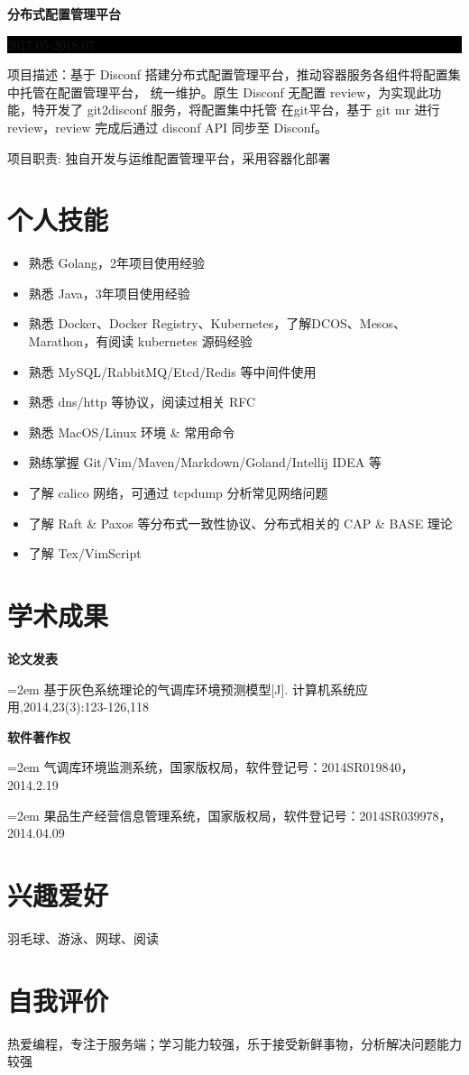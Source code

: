 \documentclass[paper=a4,fontsize=11pt]{scrartcl} %
\newcommand{\sepspace}{\vspace*{1em}}		%
\newcommand{\Section}[1]{\section*{ #1 }}          %
\newcommand{\SubSection}[2]{
	\sepspace \noindent \textbf{#1} \hfill      %
	\colorbox{Black}{\parbox{7em}{\hfill\color{White}#2}} \par  %
	\normalsize \par \sepspace}
\newcommand{\Academic}[2]{
		\noindent \textbf{#1} \par      %
		\hangindent=2em \small #2 %
		\normalsize \par}
\begin{document}
\begin{CJK}{UTF8}{gbsn}
\SubSection{分布式配置管理平台}{2017.05-2018.07}
项目描述：基于 Disconf 搭建分布式配置管理平台，推动容器服务各组件将配置集中托管在配置管理平台，
统一维护。原生 Disconf 无配置 review，为实现此功能，特开发了 git2disconf 服务，将配置集中托管
在git平台，基于 git mr 进行 review，review 完成后通过 disconf API 同步至 Disconf。\par
\sepspace
项目职责: 独自开发与运维配置管理平台，采用容器化部署

\Section{个人技能}

\begin{itemize}
	\item 熟悉 Golang，2年项目使用经验
	\item 熟悉 Java，3年项目使用经验
	\item 熟悉 Docker、Docker Registry、Kubernetes，了解DCOS、Mesos、Marathon，有阅读 kubernetes 源码经验
	\item 熟悉 MySQL/RabbitMQ/Etcd/Redis 等中间件使用
	\item 熟悉 dns/http 等协议，阅读过相关 RFC
	\item 熟悉 MacOS/Linux 环境 \& 常用命令
	\item 熟练掌握 Git/Vim/Maven/Markdown/Goland/Intellij IDEA 等
	\item 了解 calico 网络，可通过 tcpdump 分析常见网络问题
	\item 了解 Raft \& Paxos 等分布式一致性协议、分布式相关的 CAP \& BASE 理论
	\item 了解 Tex/VimScript
\end{itemize}

\Section{学术成果}

\Academic{论文发表}{基于灰色系统理论的气调库环境预测模型[J]. 计算机系统应用,2014,23(3):123-126,118}
\sepspace

\Academic{软件著作权}{气调库环境监测系统，国家版权局，软件登记号：2014SR019840，2014.2.19}
\Academic{}{果品生产经营信息管理系统，国家版权局，软件登记号：2014SR039978，2014.04.09}
\sepspace

\Section{兴趣爱好}
羽毛球、游泳、网球、阅读

\Section{自我评价}
热爱编程，专注于服务端；学习能力较强，乐于接受新鲜事物，分析解决问题能力较强
\end{CJK}     %
\end{document}
